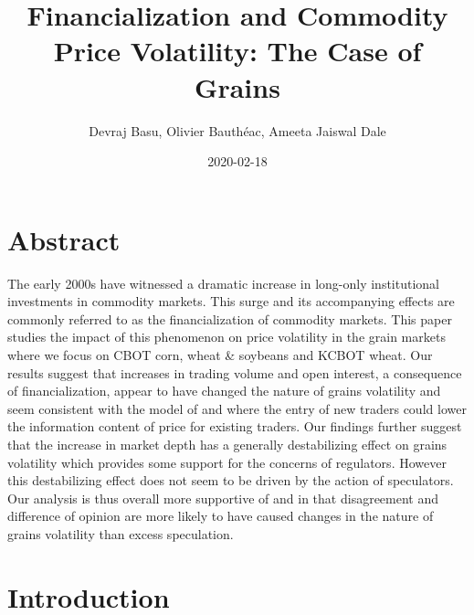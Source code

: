 \documentclass[
]{book}
\title{Financialization and Commodity Price Volatility: The Case of Grains}
\author{Devraj Basu, Olivier Bauthéac, Ameeta Jaiswal Dale}
\date{2020-02-18}
\begin{document}
\maketitle

{
\setcounter{tocdepth}{1}
\tableofcontents
}
\hypertarget{abstract}{%
\chapter{Abstract}\label{abstract}}

The early 2000s have witnessed a dramatic increase in long-only institutional investments in commodity markets. This surge and its accompanying effects are commonly referred to as the financialization of commodity markets. This paper studies the impact of this phenomenon on price volatility in the grain markets where we focus on CBOT corn, wheat \& soybeans and KCBOT wheat. Our results suggest that increases in trading volume and open interest, a consequence of financialization, appear to have changed the nature of grains volatility and seem consistent with the model of \citet{stein_informational_1987} and \citet{goldstein_information_2015} where the entry of new traders could lower the information content of price for existing traders. Our findings further suggest that the increase in market depth has a generally destabilizing effect on grains volatility which provides some support for the concerns of regulators. However this destabilizing effect does not seem to be driven by the action of speculators. Our analysis is thus overall more supportive of \citet{singleton_investor_2013} and \citet{stein_informational_1987} in that disagreement and difference of opinion are more likely to have caused changes in the nature of grains volatility than excess speculation.

\hypertarget{intro}{%
\chapter{Introduction}\label{intro}}
\end{document}
